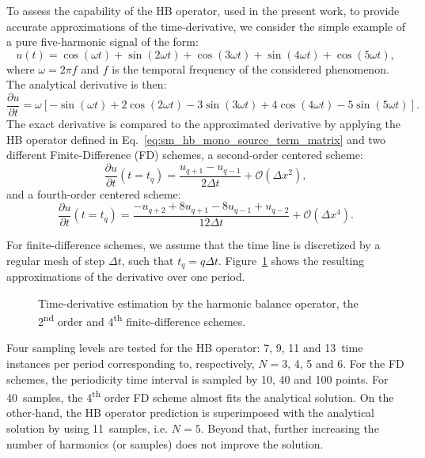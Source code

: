
To assess the capability of the HB operator, used in the present work, to
provide accurate approximations of the time-derivative, 
we consider the simple example of a pure
five-harmonic signal of the form:
\begin{equation}
    \label{eq:sum_sin}
    u(t) = \cos(\omega t) + \sin(2 \omega t) +
    \cos(3 \omega t) + \sin(4 \omega t) + \cos(5 \omega t),
\end{equation}
where $\omega = 2 \pi f$ and $f$ is the temporal frequency of
the considered phenomenon.
The analytical derivative is then:
\begin{equation}
    \label{eq:sum_sin_deriv}
    \frac{\partial u}{\partial t} = 
    \omega\left[ -\sin(\omega t) + 
    2\cos(2 \omega t) -
    3\sin(3 \omega t) + 
    4\cos(4 \omega t) -
    5\sin(5 \omega t)\right].
\end{equation}
The exact derivative is compared to the approximated derivative by applying 
the HB operator defined in Eq.~\eqref{eq:sm_hb_mono_source_term_matrix}
and two different Finite-Difference (FD) schemes,
a second-order centered scheme:
\begin{equation}
    \frac{\partial u}{\partial t} (t=t_q) =
    \frac{u_{q+1} - u_{q-1}}{2 \Delta t} + \mathcal{O} (\Delta x^2),
    \label{eq:hb_op_center2}
\end{equation}
and a fourth-order centered scheme:
\begin{equation}
    \frac{\partial u}{\partial t} (t=t_q) =
    \frac{-u_{q+2} + 8 u_{q+1} - 8 u_{q-1} + u_{q-2}}{12\Delta t}
    + \mathcal{O} (\Delta x^4).
    \label{eq:hb_op_center4}
\end{equation}

For finite-difference schemes, 
we assume that the time line is discretized 
by a regular mesh of step $\Delta t$, such that $t_q = q \Delta t$.
Figure~\ref{fig:hb_operator_sample} shows the resulting approximations 
of the derivative over one period.
\begin{figure}
  \centering
  \caption{Time-derivative estimation by the harmonic balance operator,
  the 2\textsuperscript{nd} order and 4\textsuperscript{th} finite-difference schemes.}
  \label{fig:hb_operator_sample}
\end{figure}
Four sampling levels
are tested for the HB operator: 7, 9, 11 and 13~time instances per period
corresponding to, respectively, $N=3$, 4, 5 and 6.
For the FD schemes, the periodicity time interval is sampled by
10, 40 and 100 points.
For 40~samples, the 4\textsuperscript{th} order FD
scheme almost fits the analytical solution. On the other-hand,
the HB operator prediction is superimposed with the analytical solution
by using 11~samples, i.e. $N=5$. Beyond that, further increasing the
number of harmonics (or samples)
does not improve the solution.

